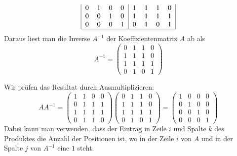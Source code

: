 \begin{loesung}
\begin{teilaufgaben}
\begin{align*}
\begin{tabular}{|>{$}c<{$}>{$}c<{$}>{$}c<{$}>{$}c<{$}|>{$}c<{$}>{$}c<{$}>{$}c<{$}>{$}c<{$}|}
   0 & 1 & 0 & 0 &  1 & 1 & 1 & 0 \\
   0 & 0 & 1 & 0 &  1 & 1 & 1 & 1 \\
   0 & 0 & 0 & 1 &  0 & 1 & 0 & 1 \\
\hline
\end{tabular}
\end{align*}
Daraus liest man die Inverse $A^{-1}$ der Koeffizientenmatrix $A$ ab als
\[
A^{-1}
=
\begin{pmatrix}
   0 & 1 & 1 & 0 \\
   1 & 1 & 1 & 0 \\
   1 & 1 & 1 & 1 \\
   0 & 1 & 0 & 1 
\end{pmatrix}
\]
\item Wir prüfen das Resultat durch Ausmultiplizieren:
\[
AA^{-1}
=
\begin{pmatrix}
   1 & 1 & 0 & 0 \\
   0 & 1 & 1 & 1 \\
   1 & 1 & 1 & 1 \\
   0 & 1 & 1 & 0 
\end{pmatrix}
\begin{pmatrix}
   0 & 1 & 1 & 0 \\
   1 & 1 & 1 & 0 \\
   1 & 1 & 1 & 1 \\
   0 & 1 & 0 & 1 
\end{pmatrix}
=
\begin{pmatrix}
   1 & 0 & 0 & 0 \\
   0 & 1 & 0 & 0 \\
   0 & 0 & 1 & 0 \\
   0 & 0 & 0 & 1 
\end{pmatrix}
\]
Dabei kann man verwenden, dass der Eintrag in Zeile $i$ und Spalte $k$ des
Produktes die Anzahl der Positionen ist, wo in der Zeile $i$ von $A$
und in der Spalte $j$ von $A^{-1}$ eine $1$ steht.
\end{teilaufgaben}
\end{loesung}
